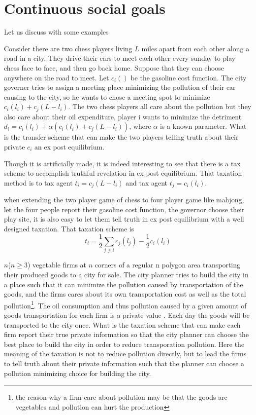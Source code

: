 \section{Continuous social goals}
Let us discuss with some examples
\begin{example}
 Consider there are two chess players living $L$ miles apart from each other along a road in a city. They drive their cars to meet
 each other every sunday to play chess face to face, and then go back home. Suppose that they can choose anywhere on the road to meet. Let
 $c_i()$ be the gasoline cost function. 
The city governer tries to assign a meeting place minimizing the pollution of their car causing to the city, so he wants to
chose a meeting spot to minimize $c_i(l_i)+c_j(L-l_i)$. The two chess players all care about the 
pollution but they also care about their oil expenditure, player i wants to minimize the detriment $d_i= c_i(l_i)+ \alpha(c_i(l_i)+c_j(L-l_i))$, where $\alpha$
is a known parameter. What
 is the transfer scheme that can make the two players telling truth about their private $c_i$ an ex post equilibrium.
\end{example}
Though it is artificially made, it is indeed interesting to see that there is a tax scheme to accomplish truthful revelation in ex post equilibrium.
That taxation method is to tax agent $t_i= c_j(L-l_i)$ and tax agent $t_j= c_i(l_i)$.

when extending the two player game of chess to four player game like mahjong, let the four people report their gasoline cost function, the governor choose their play site,
it is also easy to let them tell truth in ex post equilibrium with a well designed taxation. That taxation scheme is
$$t_i= \frac{1}{2} \sum_{j\not = i}c_j(l_j) - \frac{1}{2} c_i(l_i)$$
\begin{example}
 $n$($n \geq 3$) vegetable firms at $n$ corners of a regular n polygon area transporting their produced goods to a city for sale.
The city planner tries to build the city in a place such that it can minimize the pollution caused by transportation of the goods, 
and the firms cares about its own transportation cost as well as the total pollution\footnote{the reason why a firm care about pollution
may be that the goods are vegetables and pollution can hurt the production}. The oil consumption and thus pollution caused 
by a given amount of goods transportation for each firm is a private value . Each day the goods will be transported to the city once.
What is the taxation scheme that can make each firm report their true private information so that the city 
planner can choose the best place to build the city in order to reduce transporation pollution. Here the meaning of the taxation is not
to reduce pollution directly, but to lead the firms to tell truth about their private information such that the planner can choose a
pollution minimizing choice for building the city.
\end{example}

